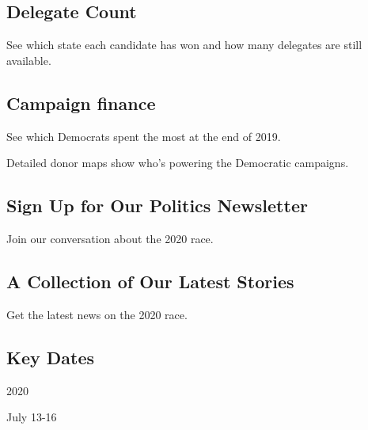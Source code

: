 \hypertarget{delegate-count}{%
\subsection{Delegate Count}\label{delegate-count}}

See which state each candidate has won and how many delegates are still
available.

\href{https://www.nytimes.com/interactive/2020/02/01/us/elections/democratic-q4-fundraising.html}{}

\hypertarget{campaign-finance}{%
\subsection{Campaign finance}\label{campaign-finance}}

See which Democrats spent the most at the end of 2019.

\href{https://www.nytimes.com/interactive/2020/02/01/us/politics/democratic-presidential-campaign-donors.html}{}

Detailed donor maps show who's powering the Democratic campaigns.

\href{https://www.nytimes.com/newsletters/politics}{}

\hypertarget{sign-up-for-our-politics-newsletter}{%
\subsection{Sign Up for Our Politics
Newsletter}\label{sign-up-for-our-politics-newsletter}}

Join our conversation about the 2020 race.

\href{https://www.nytimes.com/news-event/2020-election}{}

\hypertarget{a-collection-of-our-latest-stories}{%
\subsection{A Collection of Our Latest
Stories}\label{a-collection-of-our-latest-stories}}

Get the latest news on the 2020 race.

\hypertarget{key-dates}{%
\subsection{Key Dates}\label{key-dates}}

2020

July 13-16

